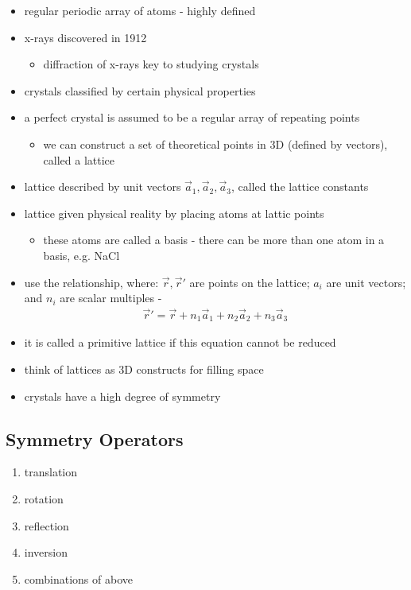\documentclass[a4paper,11pt,normalem]{article}
\begin{document}
\begin{itemize}
    \item regular periodic array of atoms - highly defined
    \item x-rays discovered in 1912
        \begin{itemize}
            \item diffraction of x-rays key to studying crystals
        \end{itemize}
    \item crystals classified by certain physical properties
    \item a perfect crystal is assumed to be a regular array of repeating points
        \begin{itemize}
            \item we can construct a set of theoretical points in 3D (defined by vectors), called a lattice
        \end{itemize}
    \item lattice described by unit vectors \(\vec{a}_1,\vec{a}_2,\vec{a}_3\), called the lattice constants
    \item lattice given physical reality by placing atoms at lattic points
        \begin{itemize}
            \item these atoms are called a basis - there can be more than one atom in a basis, e.g. NaCl
        \end{itemize}
    \item use the relationship, where: \(\vec{r},\vec{r}'\) are points on the lattice; \(a_i\) are unit vectors; and \(n_i\) are scalar multiples -
        \begin{align*}
            \vec{r}' = \vec{r} + n_1\vec{a}_1 + n_2\vec{a}_2 + n_3\vec{a}_3
        \end{align*}
    \item it is called a primitive lattice if this equation cannot be reduced
    \item think of lattices as 3D constructs for filling space
    \item crystals have a high degree of symmetry
\end{itemize}

\subsection{Symmetry Operators}

\begin{enumerate}
    \item translation
    \item rotation
    \item reflection
    \item inversion
    \item combinations of above
\end{enumerate}
\end{document}
